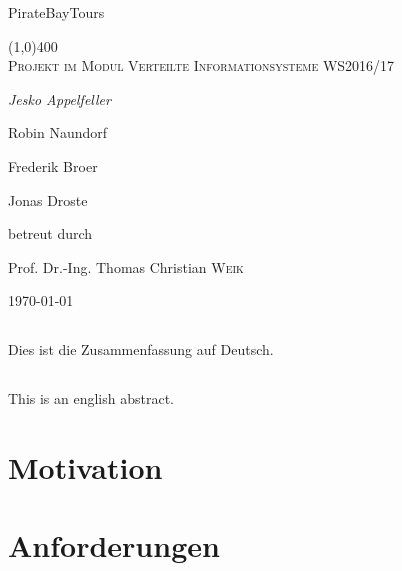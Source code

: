 \documentclass[12pt,a4paper,ngerman,english]{report}
\begin{document}
\begin{titlepage}
\begin{center}	
	\Huge{PirateBayTours}
	
	\line(1,0){400} \\
	\textsc{\Large Projekt im Modul Verteilte Informationsysteme WS2016/17}\\
	[10cm]

	{\Large\itshape Jesko Appelfeller \par Robin Naundorf \par Frederik Broer \par Jonas Droste \par  }
	\vfill

	\large{betreut durch\par
		Prof. Dr.-Ing. Thomas Christian \textsc{Weik}}

	\vfill
	{\large \today\par}

\end{center}
\end{titlepage}
\newpage

\begin{samepage}
\section*{\centering\abstractname}
Dies ist die Zusammenfassung auf Deutsch.
\vfill
{}
\section*{\centering\abstractname}
This is an english abstract.
 \vfill
\end{samepage}



\newpage
\tableofcontents

\chapter{Motivation}

\chapter{Anforderungen}
\section{}
\end{document}

